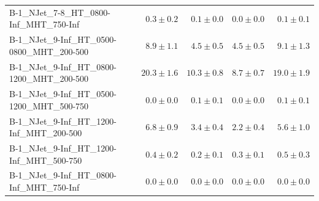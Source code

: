 \documentclass{beamer}
\begin{document}
\begin{frame}
\begin{tabular}{lrrrr}
       B-1\_NJet\_7-8\_HT\_0800-Inf\_MHT\_750-Inf &               $0.3\pm0.2$&              $0.1\pm0.0$&              $0.0\pm0.0$&                   $0.1\pm0.1$ \\ 
    B-1\_NJet\_9-Inf\_HT\_0500-0800\_MHT\_200-500 &               $8.9\pm1.1$&              $4.5\pm0.5$&              $4.5\pm0.5$&                   $9.1\pm1.3$ \\ 
    B-1\_NJet\_9-Inf\_HT\_0800-1200\_MHT\_200-500 &              $20.3\pm1.6$&             $10.3\pm0.8$&              $8.7\pm0.7$&                  $19.0\pm1.9$ \\ 
    B-1\_NJet\_9-Inf\_HT\_0500-1200\_MHT\_500-750 &               $0.0\pm0.0$&              $0.1\pm0.1$&              $0.0\pm0.0$&                   $0.1\pm0.1$ \\ 
     B-1\_NJet\_9-Inf\_HT\_1200-Inf\_MHT\_200-500 &               $6.8\pm0.9$&              $3.4\pm0.4$&              $2.2\pm0.4$&                   $5.6\pm1.0$ \\ 
     B-1\_NJet\_9-Inf\_HT\_1200-Inf\_MHT\_500-750 &               $0.4\pm0.2$&              $0.2\pm0.1$&              $0.3\pm0.1$&                   $0.5\pm0.3$ \\ 
     B-1\_NJet\_9-Inf\_HT\_0800-Inf\_MHT\_750-Inf &               $0.0\pm0.0$&              $0.0\pm0.0$&              $0.0\pm0.0$&                   $0.0\pm0.0$ \\ 
\bottomrule 
\end{tabular}
\end{frame}
\end{document}
